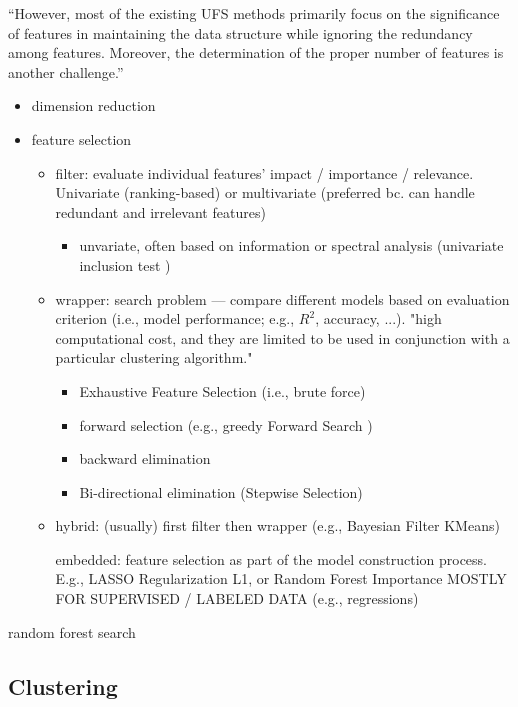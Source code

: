 ``However, most of the existing UFS methods primarily focus on the
significance of features in maintaining the data structure while
ignoring the redundancy among features. Moreover, the determination of
the proper number of features is another challenge.''

\begin{itemize}
  \item dimension reduction
  \item feature selection
  \begin{itemize}
    \item filter: evaluate individual features' impact / importance / relevance. Univariate (ranking-based) or multivariate (preferred bc. can handle redundant and irrelevant features)
    \begin{itemize}
      \item unvariate, often based on information or spectral analysis (univariate inclusion test \citep[i.e., alpha-corrected t-tests][]{christ2018})
    \end{itemize}
    \item wrapper: search problem --- compare different models based on evaluation criterion (i.e., model performance; e.g., $R^2$, accuracy, ...). "high computational cost, and they are limited to be used in conjunction with a particular clustering algorithm."
    \begin{itemize}
      \item Exhaustive Feature Selection (i.e., brute force)
      \item forward selection (e.g., greedy Forward Search \citep[][]{wang2006})
      \item backward elimination
      \item Bi-directional elimination (Stepwise Selection)
    \end{itemize}
    \item hybrid: (usually) first filter then wrapper (e.g., Bayesian Filter KMeans)
    \item [embedded: feature selection as part of the model construction process. E.g., LASSO Regularization L1, or Random Forest Importance] MOSTLY FOR SUPERVISED / LABELED DATA (e.g., regressions)
  \end{itemize}
\end{itemize}

random forest search \citep[][]{}

\subsection{Clustering}

